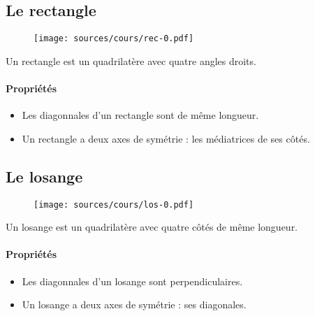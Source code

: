 \documentclass[paper=a4, fontsize=9pt]{scrartcl} %
\begin{document}
\begin{multicols}{3}
  \subsection{Le rectangle}

  \begin{figure}[H]
    \centering
    \texttt{[image: sources/cours/rec-0.pdf]}
  \end{figure}

  \begin{Definition}
    Un rectangle est un quadrilatère avec quatre angles droits.
  \end{Definition}

  \paragraph{Propriétés}
  \begin{itemize}[label=$\Diamond$]
  \item Les diagonnales d'un rectangle sont de même longueur.
  \item Un rectangle a deux axes de symétrie : les médiatrices de ses côtés.
  \end{itemize}


  \subsection{Le losange}

  \begin{figure}[H]
    \centering
    \texttt{[image: sources/cours/los-0.pdf]}
  \end{figure}

  \begin{Definition}
    Un losange est un quadrilatère avec quatre côtés de même longueur.
  \end{Definition}

  \paragraph{Propriétés}
  \begin{itemize}[label=$\Diamond$]
  \item Les diagonnales d'un losange sont perpendiculaires.
  \item Un losange a deux axes de symétrie : ses diagonales.
  \end{itemize}


\end{multicols}
\end{document}
